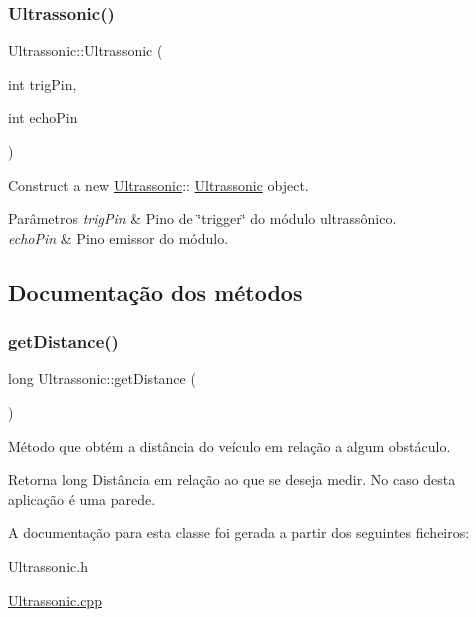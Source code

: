 \subsubsection{\texorpdfstring{Ultrassonic()}{Ultrassonic()}}
{\footnotesize\ttfamily Ultrassonic\+::\+Ultrassonic (\begin{DoxyParamCaption}\item[{int}]{trig\+Pin,  }\item[{int}]{echo\+Pin }\end{DoxyParamCaption})}



Construct a new \mbox{\hyperlink{class_ultrassonic}{Ultrassonic}}\+:\+: \mbox{\hyperlink{class_ultrassonic}{Ultrassonic}} object. 


\begin{DoxyParams}{Parâmetros}
{\em trig\+Pin} & Pino de \char`\"{}trigger\char`\"{} do módulo ultrassônico. \\
\hline
{\em echo\+Pin} & Pino emissor do módulo. \\
\hline
\end{DoxyParams}


\subsection{Documentação dos métodos}
\mbox{\label{class_ultrassonic_abe7782c662c69ad7e35b66d29bab76ec}} 
\subsubsection{\texorpdfstring{get\+Distance()}{getDistance()}}
{\footnotesize\ttfamily long Ultrassonic\+::get\+Distance (\begin{DoxyParamCaption}{ }\end{DoxyParamCaption})}



Método que obtém a distância do veículo em relação a algum obstáculo. 

\begin{DoxyReturn}{Retorna}
long Distância em relação ao que se deseja medir. No caso desta aplicação é uma parede. 
\end{DoxyReturn}


A documentação para esta classe foi gerada a partir dos seguintes ficheiros\+:\begin{DoxyCompactItemize}
\item 
Ultrassonic.\+h\item 
\mbox{\hyperlink{_ultrassonic_8cpp}{Ultrassonic.\+cpp}}\end{DoxyCompactItemize}

